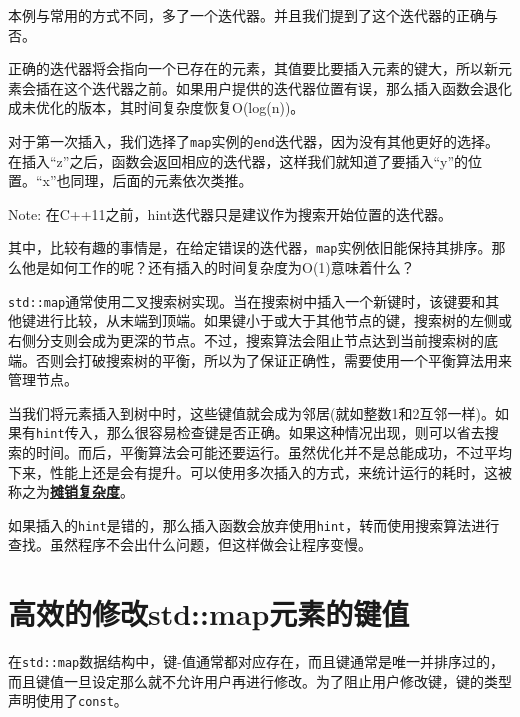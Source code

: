 
本例与常用的方式不同，多了一个迭代器。并且我们提到了这个迭代器的正确与否。

正确的迭代器将会指向一个已存在的元素，其值要比要插入元素的键大，所以新元素会插在这个迭代器之前。如果用户提供的迭代器位置有误，那么插入函数会退化成未优化的版本，其时间复杂度恢复O(log(n))。

对于第一次插入，我们选择了\texttt{map}实例的\texttt{end}迭代器，因为没有其他更好的选择。在插入“z”之后，函数会返回相应的迭代器，这样我们就知道了要插入“y”的位置。“x”也同理，后面的元素依次类推。

\begin{myInfoBox}
Note: 在C++11之前，hint迭代器只是建议作为搜索开始位置的迭代器。
\end{myInfoBox}


其中，比较有趣的事情是，在给定错误的迭代器，\texttt{map}实例依旧能保持其排序。那么他是如何工作的呢？还有插入的时间复杂度为O(1)意味着什么？

\texttt{std::map}通常使用二叉搜索树实现。当在搜索树中插入一个新键时，该键要和其他键进行比较，从末端到顶端。如果键小于或大于其他节点的键，搜索树的左侧或右侧分支则会成为更深的节点。不过，搜索算法会阻止节点达到当前搜索树的底端。否则会打破搜索树的平衡，所以为了保证正确性，需要使用一个平衡算法用来管理节点。

当我们将元素插入到树中时，这些键值就会成为邻居(就如整数1和2互邻一样)。如果有\texttt{hint}传入，那么很容易检查键是否正确。如果这种情况出现，则可以省去搜索的时间。而后，平衡算法会可能还要运行。虽然优化并不是总能成功，不过平均下来，性能上还是会有提升。可以使用多次插入的方式，来统计运行的耗时，这被称之为\href{http://programming.guide/amortized-time-complexity-analysis.html}{\textbf{摊销复杂度}}。


如果插入的\texttt{hint}是错的，那么插入函数会放弃使用\texttt{hint}，转而使用搜索算法进行查找。虽然程序不会出什么问题，但这样做会让程序变慢。


\section{高效的修改std::map元素的键值}

在\texttt{std::map}数据结构中，键-值通常都对应存在，而且键通常是唯一并排序过的，而且键值一旦设定那么就不允许用户再进行修改。为了阻止用户修改键，键的类型声明使用了\texttt{const}。

